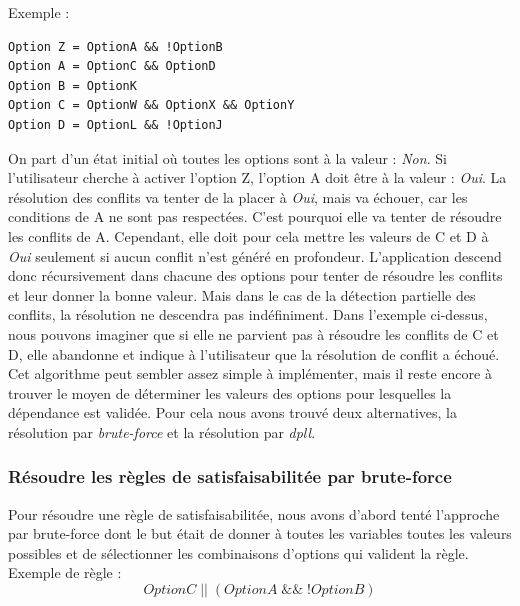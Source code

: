 \documentclass[17pts]{report}
\begin{document}
Exemple :
\begin{verbatim}
Option Z = OptionA && !OptionB
Option A = OptionC && OptionD
Option B = OptionK
Option C = OptionW && OptionX && OptionY
Option D = OptionL && !OptionJ
\end{verbatim}

On part d'un état initial où toutes les options sont à la valeur :
\textit{Non}.  Si l'utilisateur cherche à activer l'option Z, l'option A doit
être à la valeur : \textit{Oui}. La résolution des conflits va tenter de la
placer à \textit{Oui}, mais va échouer, car les conditions de A ne sont pas
respectées. C'est pourquoi elle va tenter de résoudre les conflits de A.
Cependant, elle doit pour cela mettre les valeurs de C et D à \textit{Oui}
seulement si aucun conflit n'est généré en profondeur. L'application descend
donc récursivement dans chacune des options pour tenter de résoudre les
conflits et leur donner la bonne valeur. Mais dans le cas de la détection
partielle des conflits, la résolution ne descendra pas indéfiniment. Dans
l'exemple ci-dessus, nous pouvons imaginer que si elle ne parvient pas à
résoudre les conflits de C et D, elle abandonne et indique à l'utilisateur que
la résolution de conflit a échoué.  \\

Cet algorithme peut sembler assez simple à implémenter, mais il reste encore à
trouver le moyen de déterminer les valeurs des options pour lesquelles la
dépendance est validée. Pour cela nous avons trouvé deux alternatives, la
résolution par \textit{brute-force} et la résolution par \textit{dpll}.


\subsubsection{Résoudre les règles de satisfaisabilitée par brute-force}
\label{ssub:Résoudre les règles de satisfaisabilité par brute-force}
Pour résoudre une règle de satisfaisabilitée, nous avons d'abord tenté
l'approche par brute-force dont le but était de donner à toutes les variables
toutes les valeurs possibles et de sélectionner les combinaisons d'options qui
valident la règle.  \\

Exemple de règle :
\begin{equation}
OptionC\;||\;(OptionA\;\&\&\;!OptionB)
\end{equation}
\end{document}
